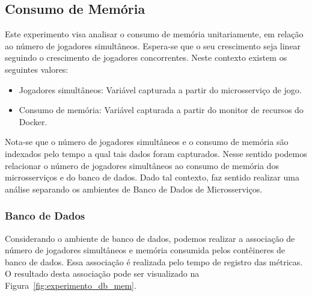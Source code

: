 \subsection{Consumo de Memória}



Este experimento visa analisar o consumo de memória unitariamente, em relação ao número de jogadores simultâneos.
%
Espera-se que o seu crescimento seja linear seguindo o crescimento de jogadores concorrentes.
%
Neste contexto existem os seguintes valores:



\begin{itemize}
    \item Jogadores simultâneos: Variável capturada a partir do microsserviço de jogo.
    \item Consumo de memória: Variável capturada a partir do monitor de recursos do Docker.
\end{itemize}

Nota-se que o número de jogadores simultâneos e o consumo de memória são indexados pelo tempo a qual tais dados foram capturados.
%
Nesse sentido podemos relacionar o número de jogadores simultâneos ao consumo de memória dos microsserviços e do banco de dados.
%
Dado tal contexto, faz sentido realizar uma análise separando os ambientes de Banco de Dados de Microsserviços.

\subsubsection{Banco de Dados}



Considerando o ambiente de banco de dados, podemos realizar a associação de número de jogadores simultâneos e memória consumida pelos contêineres de banco de dados.
%
Essa associação é realizada pelo tempo de registro das métricas.
%
O resultado desta associação pode ser visualizado na Figura~\ref{fig:experimento_db_mem}.



